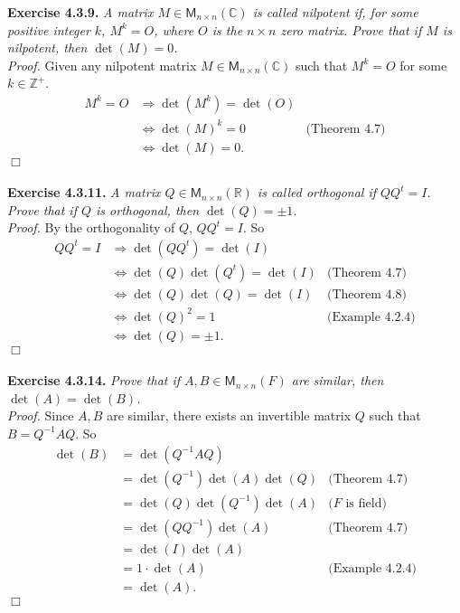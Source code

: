 \documentclass{article}
\begin{document}
\textbf{Exercise 4.3.9.}
\emph{A matrix $M \in \mathsf{M}_{n \times n}(\mathbb{C})$
is called nilpotent if,
for some positive integer $k$, $M^k = O$, where $O$ is the $n \times n$ zero matrix.
Prove that if $M$ is nilpotent, then $\det(M) = 0$.} \\

\emph{Proof.}
Given any nilpotent matrix $M \in \mathsf{M}_{n \times n}(\mathbb{C})$
such that $M^k = O$ for some $k \in \mathbb{Z}^+$.
\begin{align*}
M^k = O
&\Longrightarrow
\det(M^k) = \det(O) \\
&\Longleftrightarrow
\det(M)^k = 0
  &\text{(Theorem 4.7)} \\
&\Longleftrightarrow
\det(M) = 0.
\end{align*}
$\Box$ \\\\






\textbf{Exercise 4.3.11.}
\emph{A matrix $Q \in \mathsf{M}_{n \times n}(\mathbb{R})$
is called orthogonal if $QQ^t = I$.
Prove that if $Q$ is orthogonal, then $\det(Q) = \pm 1$.} \\

\emph{Proof.}
By the orthogonality of $Q$, $QQ^t = I$. So
\begin{align*}
QQ^t = I
&\Longrightarrow
\det(QQ^t) = \det(I) \\
&\Longleftrightarrow
\det(Q)\det(Q^t) = \det(I)
  &\text{(Theorem 4.7)} \\
&\Longleftrightarrow
\det(Q)\det(Q) = \det(I)
  &\text{(Theorem 4.8)} \\
&\Longleftrightarrow
\det(Q)^2 = 1
  &\text{(Example 4.2.4)} \\
&\Longleftrightarrow
\det(Q) = \pm 1.
\end{align*}
$\Box$ \\\\






\textbf{Exercise 4.3.14.}
\emph{Prove that if $A, B \in \mathsf{M}_{n \times n}(F)$
are similar, then $\det(A) = \det(B)$.} \\

\emph{Proof.}
Since $A, B$ are similar, there exists an invertible matrix $Q$
such that $B = Q^{-1}AQ$.
So
\begin{align*}
\det(B)
&= \det(Q^{-1}AQ) \\
&= \det(Q^{-1})\det(A)\det(Q)
  &\text{(Theorem 4.7)} \\
&= \det(Q)\det(Q^{-1})\det(A)
  &\text{($F$ is field)} \\
&= \det(Q Q^{-1})\det(A)
  &\text{(Theorem 4.7)} \\
&= \det(I)\det(A) \\
&= 1 \cdot \det(A)
  &\text{(Example 4.2.4)} \\
&= \det(A).
\end{align*}
$\Box$ \\\\
\end{document}
